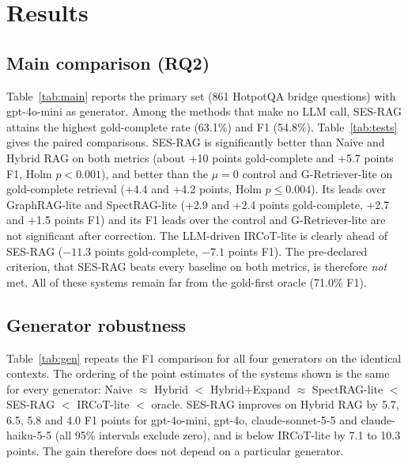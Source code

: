 \section{Results}
\label{sec:results}

\subsection{Main comparison (RQ2)}
Table~\ref{tab:main} reports the primary set (861 HotpotQA bridge questions) with gpt-4o-mini as generator. Among the methods that make no LLM call, SES-RAG attains the highest gold-complete rate (63.1\%) and F1 (54.8\%). Table~\ref{tab:tests} gives the paired comparisons. SES-RAG is significantly better than Naive and Hybrid RAG on both metrics (about +10 points gold-complete and +5.7 points F1, Holm $p<0.001$), and better than the $\mu{=}0$ control and G-Retriever-lite on gold-complete retrieval (+4.4 and +4.2 points, Holm $p\le 0.004$). Its leads over GraphRAG-lite and SpectRAG-lite (+2.9 and +2.4 points gold-complete, +2.7 and +1.5 points F1) and its F1 leads over the control and G-Retriever-lite are not significant after correction. The LLM-driven IRCoT-lite is clearly ahead of SES-RAG ($-11.3$ points gold-complete, $-7.1$ points F1). The pre-declared criterion, that SES-RAG beats every baseline on both metrics, is therefore \emph{not} met. All of these systems remain far from the gold-first oracle (71.0\% F1).




\subsection{Generator robustness}
Table~\ref{tab:gen} repeats the F1 comparison for all four generators on the identical contexts. The ordering of the point estimates of the systems shown is the same for every generator: Naive $\approx$ Hybrid $<$ Hybrid+Expand $\approx$ SpectRAG-lite $<$ SES-RAG $<$ IRCoT-lite $<$ oracle. SES-RAG improves on Hybrid RAG by 5.7, 6.5, 5.8 and 4.0 F1 points for gpt-4o-mini, gpt-4o, claude-sonnet-5-5 and claude-haiku-5-5 (all 95\% intervals exclude zero), and is below IRCoT-lite by 7.1 to 10.3 points. The gain therefore does not depend on a particular generator.



